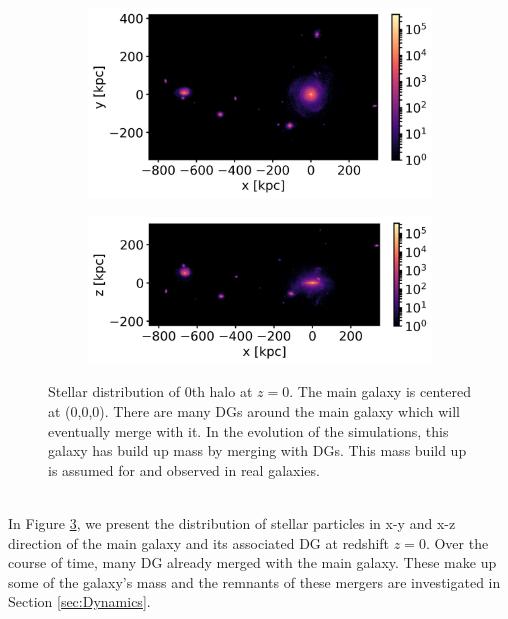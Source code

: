 \begin{figure}[htbp]
\captionsetup{format=plain}
    \centering
    \begin{subfigure}[b]{0.8\textwidth}
	    \includegraphics[width=\textwidth]{plots/Auriga/Au24_stars_xy_distribution_halo0.png}
	    \label{fig:Au24_stars_xy}
    \end{subfigure}
    
    \begin{subfigure}[b]{0.8\textwidth}
    \centering
    	\includegraphics[width=\textwidth]{plots/Auriga/Au24_stars_xz_distribution_halo0.png}
    	\label{fig:Au24_stars_xz}
    \end{subfigure}
    \caption{Stellar distribution of 0th halo at $\textit{z}=0$. The main galaxy is centered at (0,0,0). There are many \acp{DG} around the main galaxy which will eventually merge with it. In the evolution of the simulations, this galaxy has build up mass by merging with \acp{DG}. This mass build up is assumed for and observed in real galaxies.}\label{fig:Stars_AU24}
\end{figure}
\\In Figure \ref{fig:Stars_AU24}, we present the distribution of stellar particles in x-y and x-z direction of the main galaxy and its associated \ac{DG} at redshift $z=0$. Over the course of time, many \ac{DG} already merged with the main galaxy. These make up some of the galaxy's mass and the remnants of these mergers are investigated in Section \ref{sec:Dynamics}.\\
